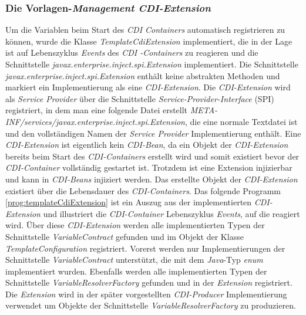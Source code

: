 \subsubsection{Die Vorlagen-\emph{Management CDI-Extension}}
Um die Variablen beim Start des \emph{CDI Containers} automatisch registrieren zu können, wurde die Klasse \emph{TemplateCdiExtension} implementiert, die in der Lage ist auf Lebenszyklus \emph{Events} des \emph{CDI -Containers} zu reagieren und die Schnittstelle \emph{javax.enterprise.inject.spi.Extension} implementiert. Die Schnittstelle \emph{javax.enterprise.inject.spi.Extension} enthält keine abstrakten Methoden und markiert ein Implementierung als eine \emph{CDI-Extension}. Die \emph{CDI-Extension} wird als \emph{Service Provider} über die Schnittstelle \emph{Service-Provider-Interface} (SPI) registriert, in dem man eine folgende Datei erstellt \emph{META-INF/services/javax.enterprise.inject.spi.Extension}, die eine normale Textdatei ist und den vollständigen Namen der \emph{Service Provider} Implementierung enthält. 
\newline
\newline
Eine \emph{CDI-Extension} ist eigentlich kein \emph{CDI-Bean}, da ein Objekt der \emph{CDI-Extension} bereits beim Start des \emph{CDI-Containers} erstellt wird und somit existiert bevor der \emph{CDI-Container} vollständig gestartet ist. Trotzdem ist eine Extension injizierbar und kann in \emph{CDI-Beans} injiziert werden. Das erstellte Objekt der \emph{CDI-Extension} existiert über die Lebensdauer des \emph{CDI-Containers}.
\newline
\newline
Das folgende Programm \ref{prog:templateCdiExtension} ist ein Auszug aus der implementierten \emph{CDI-Extension} und illustriert die \emph{CDI-Container} Lebenszyklus \emph{Events}, auf die reagiert wird. Über diese \emph{CDI-Extension} werden alle implementierten Typen der Schnittstelle \emph{VariableContract} gefunden und im Objekt der Klasse \emph{TemplateConfiguration} registriert. Vorerst werden nur Implementierungen der Schnittstelle \emph{VariableContract} unterstützt, die mit dem \emph{Java}-Typ \emph{enum} implementiert wurden. Ebenfalls werden alle implementierten Typen der Schnittstelle \emph{VariableResolverFactory} gefunden und in der \emph{Extension} registriert. Die \emph{Extension} wird  in der später vorgestellten \emph{CDI-Producer} Implementierung verwendet um Objekte der Schnittstelle \emph{VariableResolverFactory} zu produzieren. 
\newpage
